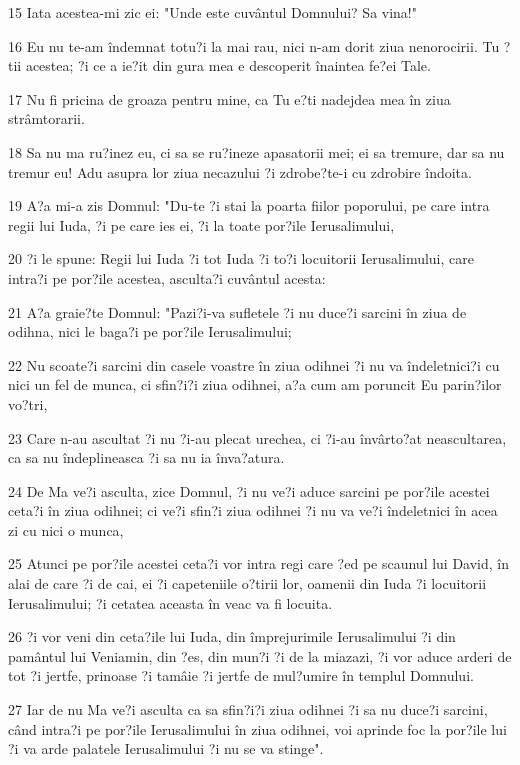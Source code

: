 \par 15 Iata acestea-mi zic ei: "Unde este cuvântul Domnului? Sa vina!"
\par 16 Eu nu te-am îndemnat totu?i la mai rau, nici n-am dorit ziua nenorocirii. Tu ?tii acestea; ?i ce a ie?it din gura mea e descoperit înaintea fe?ei Tale.
\par 17 Nu fi pricina de groaza pentru mine, ca Tu e?ti nadejdea mea în ziua strâmtorarii.
\par 18 Sa nu ma ru?inez eu, ci sa se ru?ineze apasatorii mei; ei sa tremure, dar sa nu tremur eu! Adu asupra lor ziua necazului ?i zdrobe?te-i cu zdrobire îndoita.
\par 19 A?a mi-a zis Domnul: "Du-te ?i stai la poarta fiilor poporului, pe care intra regii lui Iuda, ?i pe care ies ei, ?i la toate por?ile Ierusalimului,
\par 20 ?i le spune: Regii lui Iuda ?i tot Iuda ?i to?i locuitorii Ierusalimului, care intra?i pe por?ile acestea, asculta?i cuvântul acesta:
\par 21 A?a graie?te Domnul: "Pazi?i-va sufletele ?i nu duce?i sarcini în ziua de odihna, nici le baga?i pe por?ile Ierusalimului;
\par 22 Nu scoate?i sarcini din casele voastre în ziua odihnei ?i nu va îndeletnici?i cu nici un fel de munca, ci sfin?i?i ziua odihnei, a?a cum am poruncit Eu parin?ilor vo?tri,
\par 23 Care n-au ascultat ?i nu ?i-au plecat urechea, ci ?i-au învârto?at neascultarea, ca sa nu îndeplineasca ?i sa nu ia înva?atura.
\par 24 De Ma ve?i asculta, zice Domnul, ?i nu ve?i aduce sarcini pe por?ile acestei ceta?i în ziua odihnei; ci ve?i sfin?i ziua odihnei ?i nu va ve?i îndeletnici în acea zi cu nici o munca,
\par 25 Atunci pe por?ile acestei ceta?i vor intra regi care ?ed pe scaunul lui David, în alai de care ?i de cai, ei ?i capeteniile o?tirii lor, oamenii din Iuda ?i locuitorii Ierusalimului; ?i cetatea aceasta în veac va fi locuita.
\par 26 ?i vor veni din ceta?ile lui Iuda, din împrejurimile Ierusalimului ?i din pamântul lui Veniamin, din ?es, din mun?i ?i de la miazazi, ?i vor aduce arderi de tot ?i jertfe, prinoase ?i tamâie ?i jertfe de mul?umire în templul Domnului.
\par 27 Iar de nu Ma ve?i asculta ca sa sfin?i?i ziua odihnei ?i sa nu duce?i sarcini, când intra?i pe por?ile Ierusalimului în ziua odihnei, voi aprinde foc la por?ile lui ?i va arde palatele Ierusalimului ?i nu se va stinge".

